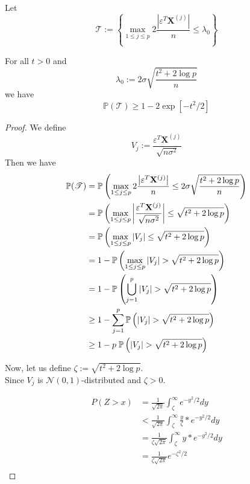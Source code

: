 Let
$$\mathscr{T} := \left\{\max _{1 \leq j \leq p} 2 \frac{\left| \varepsilon^{T} \mathbf{X}^{(j)}\right|}{n} \leq \lambda_{0}\right\}$$

\begin{lemma}[Lemma 6.2.]
    For all $t > 0$ and
    $$\lambda_{0}:=2 \sigma \sqrt{\frac{t^{2}+2 \log p}{n}}$$
    we have
    $$\mathbb{P}(\mathscr{T}) \geq 1-2 \exp \left[-t^{2} / 2\right]$$
\end{lemma}
\begin{proof}
    We define
    $$V_{j} := \frac{\varepsilon^{T} \mathbf{X}^{(j)}}{\sqrt{n \sigma^{2}}}$$
    Then we have
    \begin{align*}
        \mathbb{P}(\mathscr{T})
         & = \P \left( \max _{1 \leq j \leq p} 2 \frac{\left| \varepsilon^{T} \mathbf{X}^{(j)}\right|}{n} \leq 2 \sigma \sqrt{\frac{t^{2}+2 \log p}{n}}  \right) \\
         & =
        \P \left( \max _{1 \leq j \leq p} \left| \frac{\varepsilon^{T} \mathbf{X}^{(j)}}{\sqrt{n \sigma^{2}}} \right| \leq \sqrt{t^{2}+2 \log p}  \right)        \\
         & =
        \P \left( \max _{1 \leq j \leq p} | V_{j} | \leq \sqrt{t^{2}+2 \log p}  \right)                                                                          \\
         & = 1 - \P \left( \max _{1 \leq j \leq p} | V_{j} | > \sqrt{t^{2}+2 \log p}  \right)                                                                    \\
         & = 1 - \P \left( \bigcup_{j = 1}^{p} | V_{j} | > \sqrt{t^{2}+2 \log p}  \right)                                                                        \\
         & \geq 1 - \sum_{j = 1}^{p} \P \left( | V_{j} | > \sqrt{t^{2}+2 \log p}  \right)                                                                        \\
         & \geq 1 - p \; \P \left( | V_{j} | > \sqrt{t^{2}+2 \log p}  \right)                                                                                    \\
    \end{align*}

    Now, let us define $\zeta := \sqrt{t^{2}+2 \log p}$. \\
    Since $V_j$ is $\mathscr{N} (0,1)$-distributed and $\zeta > 0$.

    \begin{align*}
        P(Z > x) & = \frac{1}{\sqrt{2\pi}} \int_\zeta^{\infty} e^{-y^2/2} dy       \\
               & < \frac{1}{\sqrt{2\pi}} \int_\zeta^{\infty} \frac{y}{\zeta} * e^{-y^2 / 2} dy \\
               & = \frac{1}{\zeta \sqrt{2\pi}} \int_\zeta^{\infty} y * e^{-y^2 / 2} dy \\
               & = \frac{1}{\zeta\sqrt{2\pi}} e^{-\zeta^2/2}                       \\
    \end{align*}


\end{proof}
